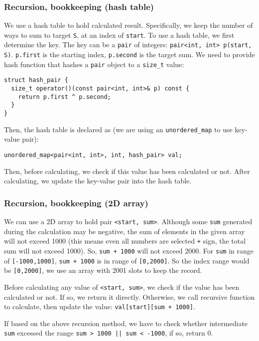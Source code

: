 \documentclass[12pt]{article}
\begin{document}
\subsubsection{Recursion, bookkeeping (hash table)}
\label{sec:org230b046}
We use a hash table to hold calculated result. Specifically, we keep the number of ways to sum to target \texttt{S}, at an index of \texttt{start}. To use a hash table, we first determine the key. The key can be a \texttt{pair} of integers: \texttt{pair<int, int> p(start, S)}. \texttt{p.first} is the starting index, \texttt{p.second} is the target sum. We need to provide hash function that hashes a \texttt{pair} object to a \texttt{size\_t} value:
\begin{verbatim}
struct hash_pair {
  size_t operator()(const pair<int, int>& p) const {
    return p.first ^ p.second;
  }
}
\end{verbatim}
Then, the hash table is declared as (we are using an \texttt{unordered\_map} to use key-value pair):
\begin{verbatim}
unordered_map<pair<int, int>, int, hash_pair> val;
\end{verbatim}

Then, before calculating, we check if this value has been calculated or not. After calculating, we update the key-value pair into the hash table.

\subsubsection{Recursion, bookkeeping (2D array)}
\label{sec:orgdbdc8ae}
We can use a 2D array to hold pair \texttt{<start, sum>}. Although some \texttt{sum} generated during the calculation may be negative, the sum of elements in the given array will not exceed 1000 (this means even all numbers are selected \texttt{+} sign, the total sum will not exceed 1000). So, \texttt{sum + 1000} will not exceed 2000. For \texttt{sum} in range of \texttt{[-1000,1000]}, \texttt{sum + 1000} is in range of \texttt{[0,2000]}. So the index range would be \texttt{[0,2000]}, we use an array with 2001 slots to keep the record.

Before calculating any value of \texttt{<start, sum>}, we check if the value has been calculated or not. If so, we return it directly. Otherwise, we call recursive function to calculate, then update the value: \texttt{val[start][sum + 1000]}.

If based on the above recursion method, we have to check whether intermediate \texttt{sum} excessed the range \texttt{sum > 1000 || sum < -1000}, if so, return 0.
\end{document}
